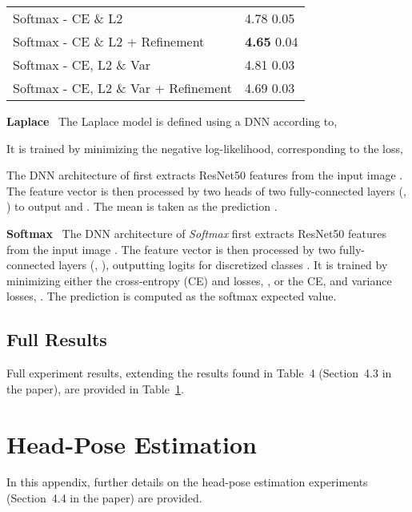 \documentclass[runningheads]{llncs}
\newcommand{\parsection}[1]{\noindent\textbf{#1}~ }
\begin{document}
\begin{appendices}
\begin{table}[t]
\begin{center}
\begin{tabular}{|l||l|}
Softmax - CE \& L2                                 &4.78  0.05 \\
Softmax - CE \& L2 + Refinement                    &\textbf{4.65}  0.04 \\
\hline

Softmax - CE, L2 \& Var                                 &4.81  0.03 \\
Softmax - CE, L2 \& Var + Refinement                    &4.69  0.03 \\

\hline
\end{tabular}\vspace{-3mm}
\label{table:age_estimation_full}
\end{center}
\end{table}

\parsection{Laplace}
The Laplace model is defined using a DNN  according to,

It is trained by minimizing the negative log-likelihood, corresponding to the loss,

The DNN architecture of  first extracts ResNet50 features  from the input image . The feature vector  is then processed by two heads of two fully-connected layers (, ) to output  and . The mean  is taken as the prediction . 

\parsection{Softmax}
The DNN architecture of \textit{Softmax} first extracts ResNet50 features  from the input image . The feature vector  is then processed by two fully-connected layers (, ), outputting logits for  discretized classes . It is trained by minimizing either the cross-entropy (CE) and  losses, , or the CE,  and variance~\cite{pan2018mean} losses, . The prediction  is computed as the softmax expected value. 



\subsection{Full Results}

Full experiment results, extending the results found in Table~4 (Section~4.3 in the paper), are provided in Table~\ref{table:age_estimation_full}.

 \section{Head-Pose Estimation}
\label{appendix:head_pose_estimation}

In this appendix, further details on the head-pose estimation experiments (Section~4.4 in the paper) are provided.


\end{appendices}
\end{document}
